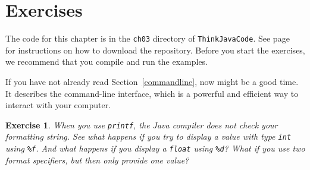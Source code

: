 \documentclass[12pt]{book}
\theoremstyle{exercise}
\newtheorem{exercise}{Exercise}[chapter]
\newcommand{\java}[1]{\verb"#1"}
\begin{document}
\section{Exercises}

The code for this chapter is in the {\tt ch03} directory of {\tt ThinkJavaCode}.
See page~\pageref{code} for instructions on how to download the repository.
Before you start the exercises, we recommend that you compile and run the examples.

If you have not already read Section~\ref{commandline}, now might be a good time.
It describes the command-line interface, which is a powerful and efficient way to interact with your computer.


\begin{exercise}
When you use \java{printf}, the Java compiler does not check your formatting string.
See what happens if you try to display a value with type \java{int} using \verb"%f".
And what happens if you display a \java{float} using \verb"%d"?
What if you use two format specifiers, but then only provide one value?
\end{exercise}

\end{document}
